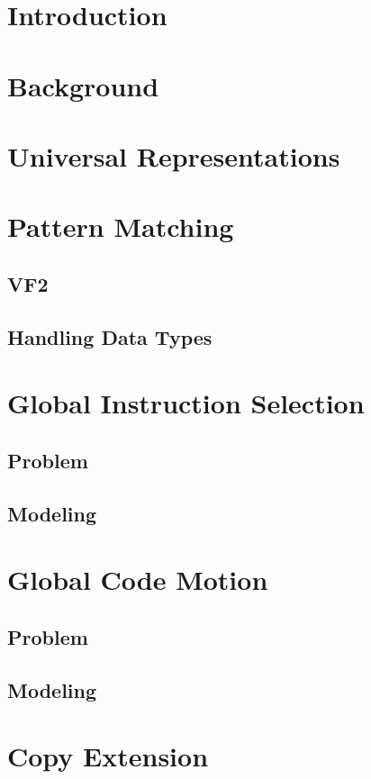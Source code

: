 \documentclass{book}
\begin{document}
\tableofcontents

\chapter{Introduction}

\chapter{Background}

\chapter{Universal Representations}

\chapter{Pattern Matching}
\section{VF2}
\section{Handling Data Types}

\chapter{Global Instruction Selection}
\section{Problem}
\section{Modeling}

\chapter{Global Code Motion}
\section{Problem}
\section{Modeling}

\chapter{Copy Extension}
\end{document}
